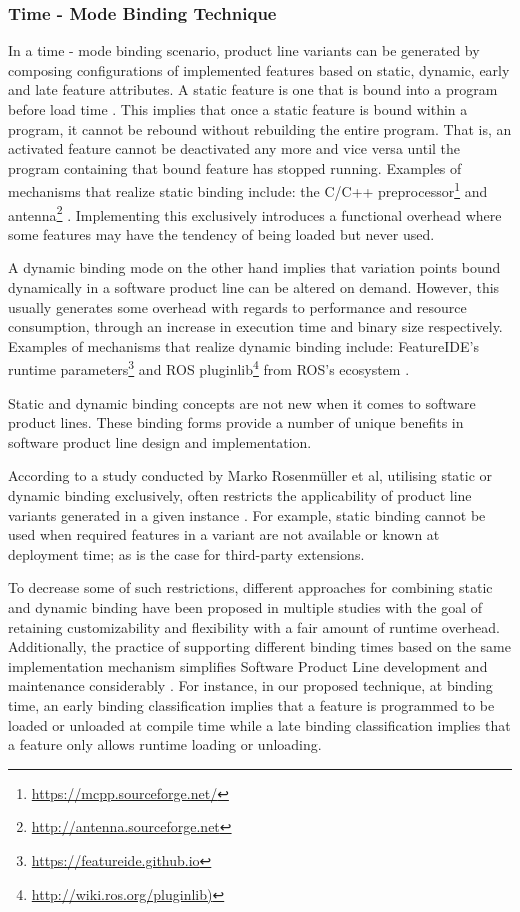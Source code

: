 \documentclass[conference]{IEEEtran}
\newcommand{\foot}[1]{\footnote{\url{#1}}}
\begin{document}
\subsubsection{Time - Mode Binding Technique}
In a time - mode binding scenario, product line variants can be generated by composing configurations of implemented features based on static, dynamic, early and late feature attributes. A static feature is one that is bound into a program before load time \cite{flex-feat-bind}. This implies that once a static feature is bound within a program, it cannot be rebound without rebuilding the entire program. That is, an activated feature cannot be deactivated any more and vice versa until the program containing that bound feature has stopped running. Examples of mechanisms that realize static binding include: the C/C++ preprocessor\foot{https://mcpp.sourceforge.net/} and antenna\foot{http://antenna.sourceforge.net} \cite{flex-feat-bind}. Implementing this exclusively introduces a functional overhead where some features may have the tendency of being loaded but never used.

A dynamic binding mode on the other hand implies that variation points bound dynamically in a software product line can be altered on demand. However, this usually generates some overhead with regards to performance and resource consumption, through an increase in execution time and binary size respectively. Examples of mechanisms that realize dynamic binding include: FeatureIDE's runtime parameters\foot{https://featureide.github.io} and ROS pluginlib\foot{http://wiki.ros.org/pluginlib)} from ROS's ecosystem \cite{flex-feat-bind}.

Static and dynamic binding concepts are not new when it comes to software product lines. These binding forms provide a number of unique benefits in software product line design and implementation. 

According to a study conducted by Marko Rosenmüller et al, utilising static or dynamic binding exclusively, often restricts the applicability of product line variants generated in a given instance \cite{flex-feat-bind}. For example, static binding cannot be used when required features in a variant are not available or known at deployment time; as is the case for third-party extensions. 

To decrease some of such restrictions, different approaches for combining static and dynamic binding have been proposed in multiple studies with the goal of retaining customizability and flexibility with a fair amount of runtime overhead. Additionally, the practice of supporting different binding times based on the same implementation mechanism simplifies Software Product Line development and maintenance considerably \cite{flex-feat-bind}. For instance, in our proposed technique, at binding time, an early binding classification implies that a feature is programmed to be loaded or unloaded at compile time while a late binding classification implies that a feature only allows runtime loading or unloading.
\end{document}
